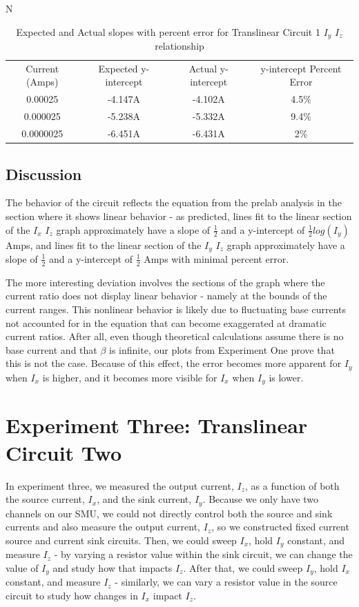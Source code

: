 N\documentclass{article}
\begin{document}
\begin{table}[h]
    \centering
    \begin{tabular}{|c|c|c|c|}
        \hline
        Current (Amps) & Expected y-intercept & Actual y-intercept & y-intercept Percent Error \\
        
         0.00025 & -4.147A & -4.102A & 4.5\% \\ \hline
         0.000025 & -5.238A & -5.332A & 9.4\% \\ \hline 
         0.0000025 & -6.451A & -6.431A & 2\% \\ \hline 
    \end{tabular}
    \caption{Expected and Actual slopes with percent error for Translinear Circuit 1 $I_y$ $I_z$ relationship}
    \label{tab:my_label}
\end{table}
\newpage
\subsection{Discussion}
The behavior of the circuit reflects the equation from the prelab analysis in the section where it shows linear behavior - as predicted, lines fit to the linear section of the $I_x$ $I_z$ graph approximately have a slope of $\frac{1}{2}$ and a y-intercept of $\frac{1}{2}log(I_y)$ Amps, and lines fit to the linear section of the $I_y$ $I_z$ graph approximately have a slope of $\frac{1}{2}$ and a y-intercept of $\frac{1}{2}$ Amps with minimal percent error.

The more interesting deviation involves the sections of the graph where the current ratio does not display linear behavior - namely at the bounds of the current ranges. This nonlinear behavior is likely due to fluctuating base currents not accounted for in the equation that can become exaggerated at dramatic current ratios. After all, even though theoretical calculations assume there is no base current and that $\beta$ is infinite, our plots from Experiment One prove that this is not the case. Because of this effect, the error becomes more apparent for $I_y$ when $I_x$ is higher, and it becomes more visible for $I_x$ when $I_y$ is lower.  

\section{Experiment Three: Translinear Circuit Two}
In experiment three, we measured the output current, $I_z$, as a function of both the source current, $I_x$, and the sink current, $I_y$. Because we only have two channels on our SMU, we could not directly control both the source and sink currents and also measure the output current, $I_z$, so we constructed fixed current source and current sink circuits. Then, we could sweep $I_x$, hold $I_y$ constant, and measure $I_z$ - by varying a resistor value within the sink circuit, we can change the value of $I_y$ and study how that impacts $I_z$. After that, we could sweep $I_y$, hold $I_x$ constant, and measure $I_z$ - similarly, we can vary a resistor value in the source circuit to study how changes in $I_x$ impact $I_z$.
\end{document}
